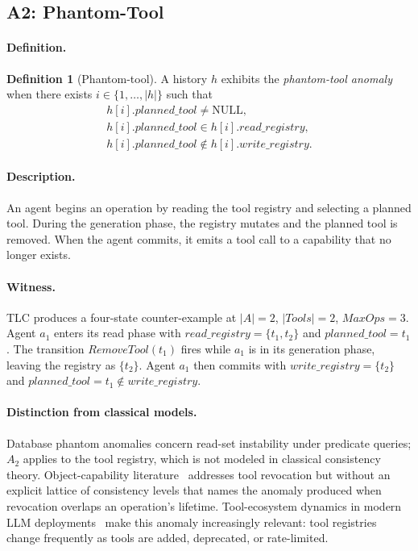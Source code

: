 \documentclass[journal,compsoc,10pt]{IEEEtran}
\providecommand{\citep}{\cite}
\theoremstyle{definition}
\newtheorem{anomaly}{Definition}
\theoremstyle{remark}
\newcommand{\fld}[1]{\mathit{#1}}
\newcommand{\rreg}{\fld{read\_registry}}
\newcommand{\wreg}{\fld{write\_registry}}
\newcommand{\pt}{\fld{planned\_tool}}
\begin{document}
\subsection{A2: Phantom-Tool}
\label{sec:a2}
\paragraph{Definition.}
\begin{anomaly}[Phantom-tool]
\label{def:a2}
A history $h$ exhibits the \emph{phantom-tool anomaly} when there
exists $i \in \{1,\ldots,|h|\}$ such that
\[
  \begin{gathered}
  h[i].\pt \neq \mathrm{NULL},\\
  h[i].\pt \in h[i].\rreg,\\
  h[i].\pt \notin h[i].\wreg.
  \end{gathered}
\]
\end{anomaly}

\paragraph{Description.}
An agent begins an operation by reading the tool registry and
selecting a planned tool. During the generation phase, the registry
mutates and the planned tool is removed. When the agent commits, it
emits a tool call to a capability that no longer exists.

\paragraph{Witness.}
TLC produces a four-state counter-example at $|A|=2$, $|\fld{Tools}|=2$,
$\fld{MaxOps}=3$. Agent $a_1$ enters its read phase with
$\rreg = \{t_1, t_2\}$ and $\pt = t_1$. The transition
$\fld{RemoveTool}(t_1)$ fires while $a_1$ is in its generation phase,
leaving the registry as $\{t_2\}$. Agent $a_1$ then commits with
$\wreg = \{t_2\}$ and $\pt = t_1 \notin \wreg$.

\paragraph{Distinction from classical models.}
Database phantom anomalies concern read-set instability under
predicate queries; $A_2$ applies to the tool registry, which is not
modeled in classical consistency theory. Object-capability
literature~\citep{Miller2006Robust,Murray2010OCap} addresses tool
revocation but without an explicit lattice of consistency levels
that names the anomaly produced when revocation overlaps an
operation's lifetime. Tool-ecosystem dynamics in modern LLM
deployments~\citep{Schick2023Toolformer,Patil2023Gorilla} make this
anomaly increasingly relevant: tool registries change frequently as
tools are added, deprecated, or rate-limited.
\end{document}
